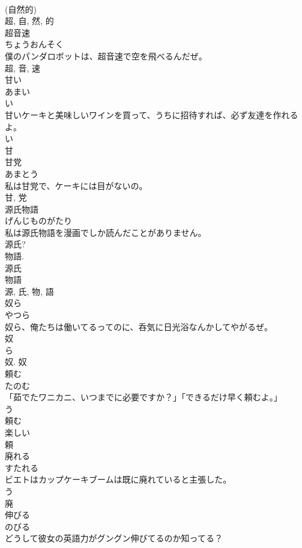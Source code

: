 \documentclass[8pt]{extreport}
\begin{document}
\begin{CJK}{UTF8}{min}
\\	(自然的) 
\\	超, 自, 然, 的	
\\	超音速	
\\	ちょうおんそく	
\\	僕のパンダロボットは、超音速で空を飛べるんだぜ。	
\\	超, 音, 速	
\\	甘い	
\\	あまい	
\\	い 
\\	甘いケーキと美味しいワインを買って、うちに招待すれば、必ず友達を作れるよ。	
\\	い 
\\	甘	
\\	甘党	
\\	あまとう	
\\	私は甘党で、ケーキには目がないの。	
\\	甘, 党	
\\	源氏物語	
\\	げんじものがたり	
\\	私は源氏物語を漫画でしか読んだことがありません。	
\\	源氏? 
\\	物語. 
\\	源氏 
\\	物語 
\\	源, 氏, 物, 語	
\\	奴ら	
\\	やつら	
\\	奴ら、俺たちは働いてるってのに、呑気に日光浴なんかしてやがるぜ。	
\\	奴 
\\	ら 
\\	奴.	奴	
\\	頼む	
\\	たのむ	
\\	「茹でたワニカニ、いつまでに必要ですか？」「できるだけ早く頼むよ。」	
\\	う 
\\	頼む 
\\	楽しい 
\\	頼	
\\	廃れる	
\\	すたれる	
\\	ビエトはカップケーキブームは既に廃れていると主張した。	
\\	う 
\\	廃	
\\	伸びる	
\\	のびる	
\\	どうして彼女の英語力がグングン伸びてるのか知ってる？	

\end{CJK}
\end{document}
